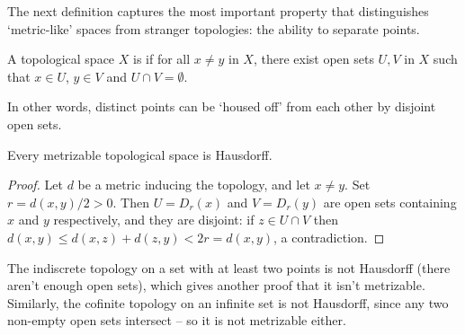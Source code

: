 The next definition captures the most important property that distinguishes `metric-like' spaces from stranger topologies: the ability to separate points.

\begin{definition}[Hausdorff]
    A topological space $X$ is  if for all $x \neq y$ in $X$, there exist open sets $U, V$ in $X$ such that $x \in U$, $y \in V$ and $U \cap V = \emptyset$.
\end{definition}

In other words, distinct points can be `housed off' from each other by disjoint open sets.

\begin{center}
\end{center}

\begin{proposition}
    Every metrizable topological space is Hausdorff.
\end{proposition}
\begin{proof}
    Let $d$ be a metric inducing the topology, and let $x \neq y$. Set $r = d(x, y)/2 > 0$. Then $U = D_r(x)$ and $V = D_r(y)$ are open sets containing $x$ and $y$ respectively, and they are disjoint: if $z \in U \cap V$ then $d(x, y) \leq d(x, z) + d(z, y) < 2r = d(x, y)$, a contradiction.
\end{proof}

\begin{example}
    The indiscrete topology on a set with at least two points is not Hausdorff (there aren't enough open sets), which gives another proof that it isn't metrizable. Similarly, the cofinite topology on an infinite set is not Hausdorff, since any two non-empty open sets intersect -- so it is not metrizable either.
\end{example}

